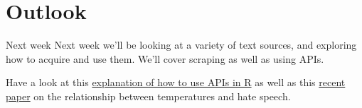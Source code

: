 \documentclass[
  10pt,
  ignorenonframetext,
  aspectratio=169]{beamer}
\newif\ifbibliography
\begin{document}
\hypertarget{outlook}{%
\section{Outlook}\label{outlook}}

\begin{frame}{Next week}
\protect\hypertarget{next-week}{}
Next week we'll be looking at a variety of text sources, and exploring
how to acquire and use them. We'll cover scraping as well as using APIs.

Have a look at this
\href{https://cbail.github.io/textasdata/apis/rmarkdown/Application_Programming_interfaces.html}{explanation
of how to use APIs in R} as well as this
\href{https://www.thelancet.com/journals/lanplh/article/PIIS2542-5196(22)00173-5/fulltext}{recent
paper} on the relationship between temperatures and hate speech.
\end{frame}

\begin{frame}[allowframebreaks]{}
  \bibliographytrue
  
\end{frame}
\end{document}
